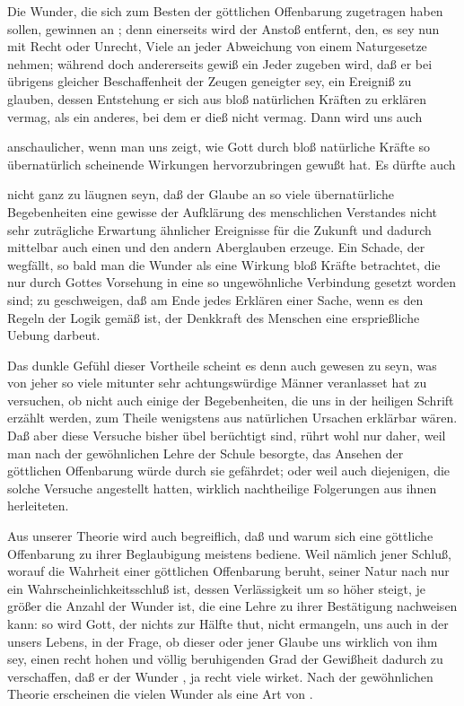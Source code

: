 \begin{aufza}
\begin{aufzb}
\item Die Wunder, die sich zum Besten der göttlichen Offenbarung zugetragen haben sollen, gewinnen an ; denn einerseits wird der Anstoß entfernt, den, es sey nun mit Recht oder Unrecht, Viele an jeder Abweichung von einem Naturgesetze nehmen; während doch andererseits gewiß ein Jeder zugeben wird, daß er bei übrigens gleicher Beschaffenheit der Zeugen geneigter sey, ein Ereigniß zu glauben, dessen Entstehung er sich aus bloß natürlichen Kräften zu erklären vermag, als ein anderes, bei dem er dieß nicht vermag. Dann wird uns auch
\item {} anschaulicher, wenn man uns zeigt, wie Gott durch bloß natürliche Kräfte so übernatürlich scheinende Wirkungen hervorzubringen gewußt hat. Es dürfte auch
\item nicht ganz zu läugnen seyn, daß der Glaube an so viele übernatürliche Begebenheiten eine gewisse der Aufklärung des menschlichen Verstandes nicht sehr zuträgliche Erwartung ähnlicher Ereignisse für die Zukunft und dadurch mittelbar auch einen und den andern Aberglauben erzeuge. Ein Schade, der wegfällt, so bald man die Wunder als eine Wirkung bloß  Kräfte betrachtet, die nur durch Gottes Vorsehung in eine so ungewöhnliche Verbindung gesetzt worden sind; zu geschweigen, daß am Ende jedes Erklären einer Sache, wenn es den Regeln der Logik gemäß ist, der Denkkraft des Menschen eine ersprießliche Uebung darbeut.
\end{aufzb}
   Das dunkle Gefühl dieser Vortheile scheint es denn auch gewesen zu seyn, was von jeher so viele mitunter sehr achtungswürdige Männer veranlasset hat zu versuchen, ob nicht auch einige der Begebenheiten, die uns in der heiligen Schrift erzählt werden, zum Theile wenigstens aus natürlichen Ursachen erklärbar wären. Daß aber diese Versuche bisher übel berüchtigt sind, rührt wohl nur daher, weil man nach der gewöhnlichen Lehre der Schule besorgte, das Ansehen der göttlichen Offenbarung würde durch sie gefährdet; oder weil auch diejenigen, die solche Versuche angestellt hatten, wirklich nachtheilige Folgerungen aus ihnen herleiteten.
\item Aus unserer Theorie wird auch begreiflich, daß und warum sich eine göttliche Offenbarung zu ihrer Beglaubigung meistens  bediene. Weil nämlich jener Schluß, worauf die Wahrheit einer göttlichen Offenbarung beruht, seiner Natur nach nur ein Wahrscheinlichkeitsschluß ist, dessen Verlässigkeit um so höher steigt, je größer die Anzahl der Wunder ist, die eine Lehre zu ihrer Bestätigung nachweisen kann: so wird Gott, der nichts zur Hälfte thut, nicht ermangeln, uns auch in der  unsers Lebens, in der Frage, ob dieser oder jener Glaube uns wirklich von ihm  sey, einen recht hohen und völlig beruhigenden Grad der Gewißheit dadurch zu verschaffen, daß er der Wunder , ja recht viele wirket. Nach der gewöhnlichen Theorie erscheinen die vielen Wunder als eine Art von .

\end{aufza}
